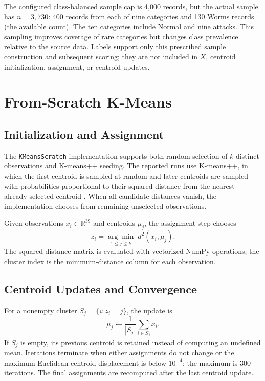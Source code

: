 \documentclass[conference]{IEEEtran}
\begin{document}
The configured class-balanced sample cap is 4,000 records, but the actual sample has $n=3{,}730$: 400 records from each of nine categories and 130 Worms records (the available count). The ten categories include Normal and nine attacks. This sampling improves coverage of rare categories but changes class prevalence relative to the source data. Labels support only this prescribed sample construction and subsequent scoring; they are not included in $X$, centroid initialization, assignment, or centroid updates.

\section{From-Scratch K-Means}
\subsection{Initialization and Assignment}
The \texttt{KMeansScratch} implementation supports both random selection of $k$ distinct observations and K-means++ seeding. The reported runs use K-means++, in which the first centroid is sampled at random and later centroids are sampled with probabilities proportional to their squared distance from the nearest already-selected centroid \cite{arthur2007}. When all candidate distances vanish, the implementation chooses from remaining unselected observations.

Given observations $x_i\in\mathbb{R}^{39}$ and centroids $\mu_j$, the assignment step chooses
\begin{equation}
 z_i=\underset{1\leq j\leq k}{\arg\min}\;d^2(x_i,\mu_j).
\end{equation}
The squared-distance matrix is evaluated with vectorized NumPy operations; the cluster index is the minimum-distance column for each observation.

\subsection{Centroid Updates and Convergence}
For a nonempty cluster $S_j=\{i:z_i=j\}$, the update is
\begin{equation}
 \mu_j\leftarrow \frac{1}{|S_j|}\sum_{i\in S_j}x_i.
\end{equation}
If $S_j$ is empty, its previous centroid is retained instead of computing an undefined mean. Iterations terminate when either assignments do not change or the maximum Euclidean centroid displacement is below $10^{-4}$; the maximum is 300 iterations. The final assignments are recomputed after the last centroid update.
\end{document}
